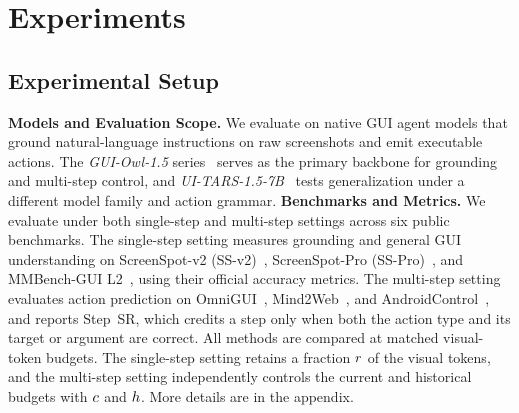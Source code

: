 \section{Experiments}
\label{sec:exp}

\subsection{Experimental Setup}
\label{sec:exp-setup}
\noindent\textbf{Models and Evaluation Scope.}
We evaluate on native GUI agent models that ground natural-language instructions on raw screenshots and emit executable actions.
%
The \textit{GUI-Owl-1.5} series~\citep{guiowl2025} serves as the primary backbone for grounding and multi-step control, and \textit{UI-TARS-1.5-7B}~\citep{qin2025uitars} tests generalization under a different model family and action grammar.
%
\noindent\textbf{Benchmarks and Metrics.}
We evaluate under both single-step and multi-step settings across six public benchmarks.
%
The single-step setting measures grounding and general GUI understanding on ScreenSpot-v2 (SS-v2)~\citep{wu2024osatlas}, ScreenSpot-Pro (SS-Pro)~\citep{li2025screenspotpro}, and MMBench-GUI L2~\citep{wang2025mmbenchgui}, using their official accuracy metrics.
%
The multi-step setting evaluates action prediction on OmniGUI~\citep{henry2026omnigui}, Mind2Web~\citep{deng2023mind2web}, and AndroidControl~\citep{li2024androidcontrol}, and reports Step~SR, which credits a step only when both the action type and its target or argument are correct.
%
All methods are compared at matched visual-token budgets. The single-step setting retains a fraction $r$ of the visual tokens, and the multi-step setting independently controls the current and historical budgets with $c$ and $h$.
%
More details are in the appendix.


\\
